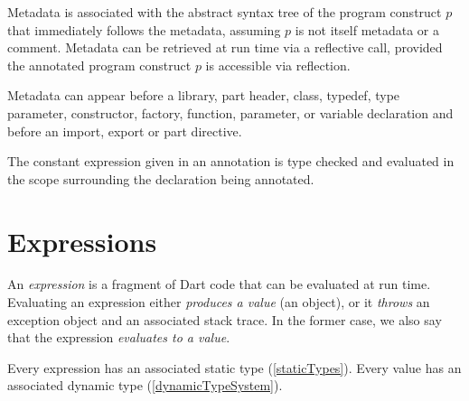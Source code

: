 \documentclass{article}
\begin{document}
\LMHash{}
Metadata is associated with the abstract syntax tree of the program construct $p$ that immediately follows the metadata, assuming $p$ is not itself metadata or a comment.
Metadata can be retrieved at run time via a reflective call, provided the annotated program construct $p$ is accessible via reflection.




\LMHash{}
Metadata can appear before a library, part header, class, typedef, type parameter, constructor, factory, function, parameter, or variable declaration and before an import, export or part directive.

\LMHash{}
The constant expression given in an annotation is type checked and evaluated in the scope surrounding the declaration being annotated.


\section{Expressions}

\LMHash{}
\label{evaluation}
An {\em expression} is a fragment of Dart code that can be evaluated at run time.
Evaluating an expression either {\em produces a value} (an object),
or it {\em throws} an exception object and an associated stack trace.
In the former case, we also say that the expression {\em evaluates to a value}.

\LMHash{}
Every expression has an associated static type (\ref{staticTypes}).
Every value has an associated dynamic type (\ref{dynamicTypeSystem}).
\end{document}
